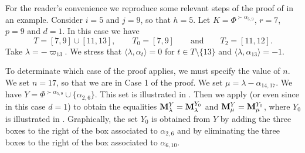 \begin{example}\rm
For the reader's convenience we reproduce some relevant steps of the proof of  in an example. 
Consider $i = 5$ and $j = 9$, so that $h = 5$. 
Let $K = \Phi^{\succ \alpha_{5,9}}$,  $r = 7$, $p = 9$ and $d = 1$. 
In this case we have
$$  T=[7,9] \cup [11,13],  \qquad T_0=[7,9] \qquad \mbox{and} \qquad T_2=[11,12].  $$
Take $\lambda = -\varpi_{13}$. 
We stress that $\langle \lambda, \alpha_t \rangle =0$ for $t\in T\setminus\{13\}$ and $\langle \lambda , \alpha_{13}\rangle =-1$.  


To determinate which case of the proof applies, we must specify the value of $n$.
We set $n=17$, so that we are in Case 1 of the proof. 
We set $\mu = \lambda-\alpha_{14,17}$. 
We have $Y = \Phi^{\succ \alpha_{5,9}} \cup \{\alpha_{2,6}\}$.
This set is illustrated in . 
Then we apply  (or even  since in this case $d=1$) to obtain the equalities $\mathbf{M}_\lambda^Y=\mathbf{M}_\lambda^{Y_0}$ and $\mathbf{M}_\mu^Y=\mathbf{M}_\mu^{Y_0}$, where $Y_0$ is illustrated in . 
Graphically, the set $Y_0$ is obtained from  $Y$ by adding the three boxes to the right of the box associated to $\alpha_{2,6}$ and by eliminating the three boxes to the right of the box associated to $\alpha_{6,10}$. 



\end{example}
